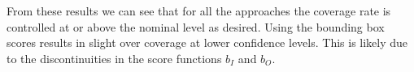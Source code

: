 From these results we can see that for all the approaches the coverage rate is controlled at or above the nominal level as desired. Using the bounding box scores results in slight over coverage at lower confidence levels. This is likely due to the discontinuities in the score functions $b_I$ and $b_O$. 


